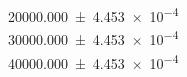 

\num{20000.000 \pm 4.453 e-4}  \\
\num{30000.000 \pm 4.453 e-4}  \\
\num{40000.000 \pm 4.453 e-4}  \\
